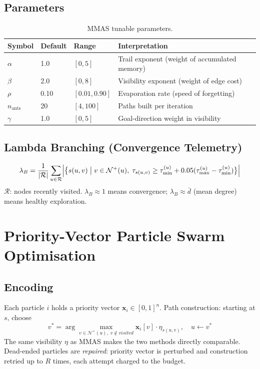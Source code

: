 \documentclass[11pt,a4paper]{article}
\theoremstyle{definition}
\newcommand{\xvec}{\mathbf{x}}
\begin{document}
\subsection{Parameters}
\begin{table}[h]\centering
  \caption{MMAS tunable parameters.}
  \begin{tabular}{lllp{5.5cm}}
    \toprule Symbol & Default & Range & Interpretation \\ \midrule
    $\alpha$ & 1.0 & $[0,5]$ & Trail exponent (weight of accumulated memory) \\
    $\beta$  & 2.0 & $[0,8]$ & Visibility exponent (weight of edge cost) \\
    $\rho$   & 0.10 & $[0.01,0.90]$ & Evaporation rate (speed of forgetting) \\
    $n_{\text{ants}}$ & 20 & $[4,100]$ & Paths built per iteration \\
    $\gamma$ & 1.0 & $[0,5]$ & Goal-direction weight in visibility \\
    \bottomrule
  \end{tabular}
\end{table}

\subsection{Lambda Branching (Convergence Telemetry)}

\[
  \lambda_B = \frac{1}{|\mathcal{R}|}\sum_{u\in\mathcal{R}}
  \Bigl|\bigl\{s(u,v)\;\big|\;v\in\mathcal{N}^+(u),\;
  \tau_{s(u,v)}\ge\tau^{(u)}_{\min}+0.05(\tau^{(u)}_{\max}-\tau^{(u)}_{\min})\bigr\}\Bigr|
\]
$\mathcal{R}$: nodes recently visited.
$\lambda_B\approx 1$ means convergence; $\lambda_B\approx\bar{d}$ (mean degree) means
healthy exploration.

\section{Priority-Vector Particle Swarm Optimisation}
\label{sec:pso}

\subsection{Encoding}

Each particle $i$ holds a priority vector $\xvec_i\in[0,1]^n$.
Path construction: starting at $s$, choose
\[
  v^* = \arg\max_{v\in\mathcal{N}^+(u),\;v\notin\mathit{visited}}
        \xvec_i[v]\cdot\eta_{s(u,v)},\quad u\leftarrow v^*
\]
The same visibility $\eta$ as MMAS makes the two methods directly comparable.
Dead-ended particles are \emph{repaired}: priority vector is perturbed and construction
retried up to $R$ times, each attempt charged to the budget.
\end{document}

